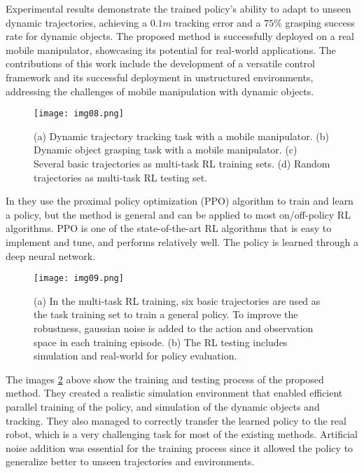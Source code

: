Experimental results demonstrate the trained policy's ability to adapt to unseen dynamic
trajectories, achieving a $0.1m$ tracking error and a $75\%$ grasping success rate for dynamic objects.
The proposed method is successfully deployed on a real mobile manipulator, showcasing its
potential for real-world applications. The contributions of this work include the development
of a versatile control framework and its successful deployment in unstructured environments,
addressing the challenges of mobile manipulation with dynamic objects.

\begin{figure}[t]
	\centering
	\texttt{[image: img08.png]}
	\captionsetup{width=1\linewidth}
	\caption{(a) Dynamic trajectory tracking task with a mobile manipulator. (b)
		Dynamic object grasping task with a mobile manipulator. (c) Several basic
		trajectories as multi-task RL training sets. (d) Random trajectories as multi-task
		RL testing set.\cite{wang2022multitask}}
	\label{fig:img08}
\end{figure}

In \cite{wang2022multitask} they use the proximal policy optimization (PPO) algorithm to train
and learn a policy, but the method is general and can be applied to most on/off-policy RL algorithms.
PPO is one of the state-of-the-art RL algorithms that is easy to implement and tune, and performs
relatively well. The policy is learned through a deep neural network.

\begin{figure}[t]
	\centering
	\texttt{[image: img09.png]}
	\captionsetup{width=1\linewidth}
	\caption{(a) In the multi-task RL training, six basic trajectories are used as the task
		training set to train a general policy. To improve the robustness, gaussian noise is added
		to the action and observation space in each training episode. (b) The RL testing includes
		simulation and real-world for policy evaluation.\cite{wang2022multitask}}
	\label{fig:img09}
\end{figure}

The images \ref{fig:img09} above show the training and testing process of the proposed method. They created a
realistic simulation environment that enabled efficient parallel training of the policy,
and simulation of the dynamic objects and tracking. They also managed to correctly transfer the
learned policy to the real robot, which is a very challenging task for most of the existing methods.
Artificial noise addition was essential for the training process since it allowed the policy
to generalize better to unseen trajectories and environments.

